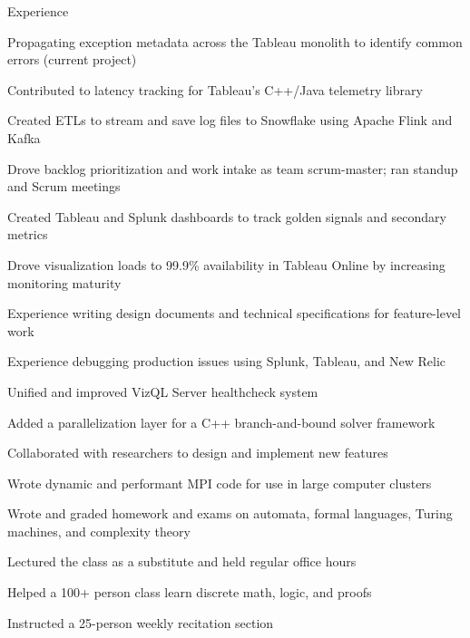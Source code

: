 \documentclass{cv}
\begin{document}

\begin{cvsection}{Experience}
  {
    \item Propagating exception metadata across the Tableau monolith to identify common errors (current project)
    \item Contributed to latency tracking for Tableau's C++/Java telemetry library
    \item Created ETLs to stream and save log files to Snowflake using Apache Flink and Kafka
    \item Drove backlog prioritization and work intake as team scrum-master; ran standup and Scrum meetings
    \item Created Tableau and Splunk dashboards to track golden signals and secondary metrics
    \item Drove visualization loads to 99.9\% availability in Tableau Online by increasing monitoring maturity
    \item Experience writing design documents and technical specifications for feature-level work
    \item Experience debugging production issues using Splunk, Tableau, and New Relic 
    \item Unified and improved VizQL Server healthcheck system
  }
  {
    \item Added a parallelization layer for a C++ branch-and-bound solver framework
    \item Collaborated with researchers to design and implement new features
    \item Wrote dynamic and performant MPI code for use in large computer clusters
  }
  {
    \item Wrote and graded homework and exams on automata, formal languages, Turing machines, and complexity theory
    \item Lectured the class as a substitute and held regular office hours
  }
  {
    \item Helped a 100+ person class learn discrete math, logic, and proofs
    \item Instructed a 25-person weekly recitation section
  }
\end{cvsection}
\end{document}
